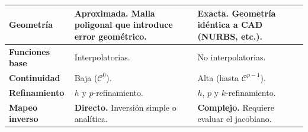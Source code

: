 \documentclass[compress]{beamer}
\begin{document}
\begin{frame}
\begin{table}[htbp]
\begin{tabular}{>{\raggedright\arraybackslash}p{2.3cm} >{\raggedright\arraybackslash}p{3.9cm} >{\raggedright\arraybackslash}p{3.5cm}}
            \textbf{Geometría} & 
            \cellcolor{desventaja} \textbf{Aproximada.} Malla poligonal que introduce error geométrico. & 
            \cellcolor{ventaja} \textbf{Exacta.} Geometría idéntica a CAD (NURBS, etc.). \\ 
            \midrule \pause 
            
            \textbf{Funciones base} & 
            Interpolatorias. & 
            No interpolatorias. \\ 
            \midrule \pause 
            
            \textbf{Continuidad} & 
            \cellcolor{desventaja} Baja ($\mathcal{C}^0$). & 
            \cellcolor{ventaja} Alta (hasta $\mathcal{C}^{p-1}$). \\ 
            \midrule \pause 
            
            \textbf{Refinamiento} & 
            $h$ y $p$-refinamiento. & 
            \cellcolor{ventaja} $h$, $p$ y \textbf{$k$}-refinamiento. \\ 
            \midrule \pause 
            
            \textbf{Mapeo inverso} & 
            \cellcolor{ventaja} \textbf{Directo.} Inversión simple o analítica. & 
            \cellcolor{desventaja} \textbf{Complejo.} Requiere evaluar el jacobiano. \\
            \bottomrule
        \end{tabular}
    \end{table}
\end{frame}

\end{document}
